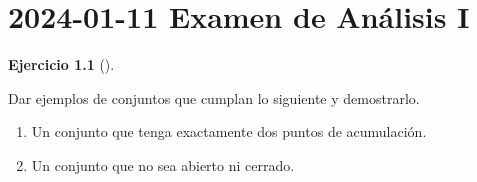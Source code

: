 \documentclass[
  spanish,
  a4paper,
]{scrreport}
\providecommand{\tightlist}{%
  \setlength{\itemsep}{0pt}\setlength{\parskip}{0pt}}
\theoremstyle{definition}
\newtheorem{exercise}{Ejercicio}[chapter]
\theoremstyle{remark}
\begin{document}

\chapter{\texorpdfstring{2024-01-11 Examen de Análisis
I}{2024-01-11  Examen de Análisis I}}\label{examen-de-anuxe1lisis-i-3}

\begin{exercise}[]\protect\hypertarget{exr-1}{}\label{exr-1}

Dar ejemplos de conjuntos que cumplan lo siguiente y demostrarlo.

\begin{enumerate}
\def\labelenumi{\alph{enumi}.}
\tightlist
\item
  Un conjunto que tenga exactamente dos puntos de acumulación.
\item
  Un conjunto que no sea abierto ni cerrado.
\end{enumerate}

\end{exercise}
\end{document}
